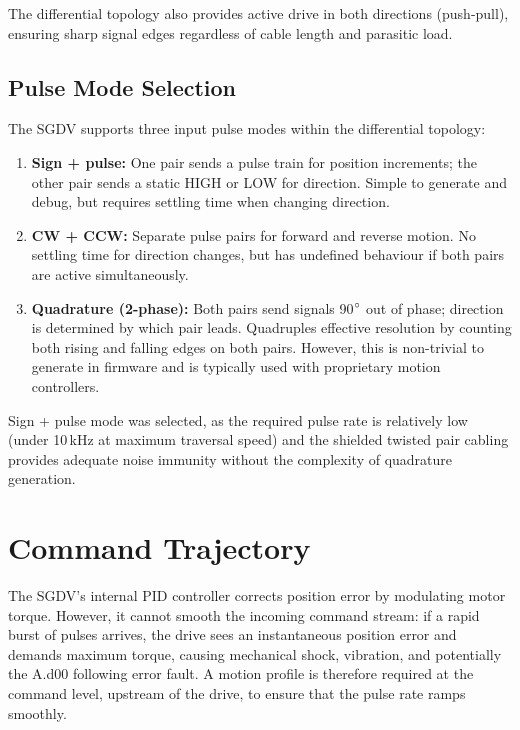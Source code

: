The differential topology also provides active drive in both directions (push-pull), ensuring sharp signal edges regardless of cable length and parasitic load.

\subsection{Pulse Mode Selection}

The SGDV supports three input pulse modes within the differential topology:

\begin{enumerate}
    \item \textbf{Sign + pulse:} One pair sends a pulse train for position increments; the other pair sends a static HIGH or LOW for direction. Simple to generate and debug, but requires settling time when changing direction.
    \item \textbf{CW + CCW:} Separate pulse pairs for forward and reverse motion. No settling time for direction changes, but has undefined behaviour if both pairs are active simultaneously.
    \item \textbf{Quadrature (2-phase):} Both pairs send signals 90$\degree$ out of phase; direction is determined by which pair leads. Quadruples effective resolution by counting both rising and falling edges on both pairs. However, this is non-trivial to generate in firmware and is typically used with proprietary motion controllers.
\end{enumerate}

Sign + pulse mode was selected, as the required pulse rate is relatively low (under 10\,kHz at maximum traversal speed) and the shielded twisted pair cabling provides adequate noise immunity without the complexity of quadrature generation.

\section{Command Trajectory}

The SGDV's internal PID controller corrects position error by modulating motor torque. However, it cannot smooth the incoming command stream: if a rapid burst of pulses arrives, the drive sees an instantaneous position error and demands maximum torque, causing mechanical shock, vibration, and potentially the A.d00 following error fault. A motion profile is therefore required at the command level, upstream of the drive, to ensure that the pulse rate ramps smoothly.

